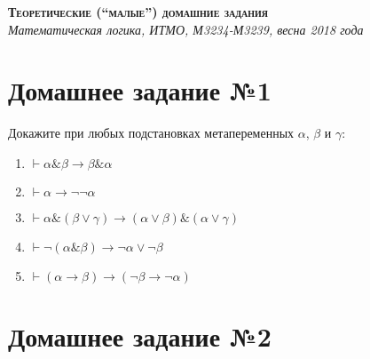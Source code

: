\documentclass[10pt,a4paper,oneside]{article}
\begin{document}
\begin{center}{\Large\textsc{\textbf{Теоретические (``малые'') домашние задания}}}\\
             \it Математическая логика, ИТМО, М3234-М3239, весна 2018 года\end{center}

\section*{Домашнее задание №1}

Докажите при любых подстановках метапеременных $\alpha$, $\beta$ и $\gamma$:
\begin{enumerate}
\item $\vdash\alpha\&\beta\rightarrow\beta\&\alpha$
\item $\vdash\alpha \rightarrow \neg\neg \alpha$
\item $\vdash\alpha\&(\beta\vee\gamma) \rightarrow (\alpha\vee\beta)\&(\alpha\vee\gamma)$
\item $\vdash\neg(\alpha\&\beta) \rightarrow \neg\alpha\vee\neg\beta$
\item $\vdash(\alpha\rightarrow\beta)\rightarrow(\neg\beta\rightarrow\neg\alpha)$
\end{enumerate}

\section*{Домашнее задание №2}
\end{document}
